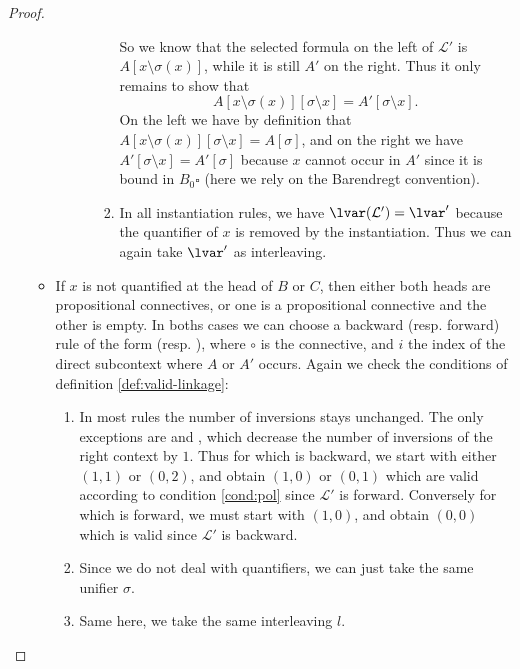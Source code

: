 \begin{proof}
\begin{enumerate}
\begin{itemize}
\begin{description}
\begin{enumerate}
            So we know that the selected formula on the left of $\mathcal{L'}$
            is $A[x \setminus \sigma(x)]$, while it is still $A'$ on the right.
            Thus it only remains to show that
            $$A[x \setminus \sigma(x)][\sigma \setminus x] = A'[\sigma \setminus
            x].$$ On the left we have by definition that $A[x \setminus
            \sigma(x)][\sigma \setminus x] = A[\sigma]$, and on the right we
            have $A'[\sigma \setminus x] = A'[\sigma]$ because $x$ cannot occur
            in $A'$ since it is bound in $B_0\square$ (here we rely on the
            Barendregt convention).

            \item In all instantiation rules, we have $\lvar(\mathcal{L'}) =
            \lvar'$ because the quantifier of $x$ is removed by the
            instantiation. Thus we can again take $\lvar'$ as interleaving.
          \end{enumerate}
          
        \end{description}

      \item If $x$ is not quantified at the head of $B$ or $C$, then either both
      heads are propositional connectives, or one is a propositional connective
      and the other is empty. In boths cases we can choose a backward (resp.
      forward) rule of the form  (resp. ), where
      $\circ$ is the connective, and $i$ the index of the direct subcontext
      where $A$ or $A'$ occurs. Again we check the conditions of definition
      \ref{def:valid-linkage}:
      
      \begin{enumerate}
        \setlength{\itemsep}{0.8em}
        \renewcommand{\labelenumii}{\theenumii}
        \renewcommand{\theenumii}{\arabic{enumii}.}
            
        \item In most rules the number of inversions stays unchanged. The only
        exceptions are  and , which
        decrease the number of inversions of the right context by $1$. Thus for
         which is backward, we start with either $(1,1)$ or
        $(0,2)$, and obtain $(1,0)$ or $(0,1)$ which are valid according to
        condition \ref{cond:pol} since $\mathcal{L'}$ is forward. Conversely for
         which is forward, we must start with $(1,0)$, and
        obtain $(0,0)$ which is valid since $\mathcal{L'}$ is backward.

        \item Since we do not deal with quantifiers, we can just take the same
        unifier $\sigma$.

        \item Same here, we take the same interleaving $l$.
      \end{enumerate}
    \end{itemize} 
  \end{enumerate}
\end{proof}